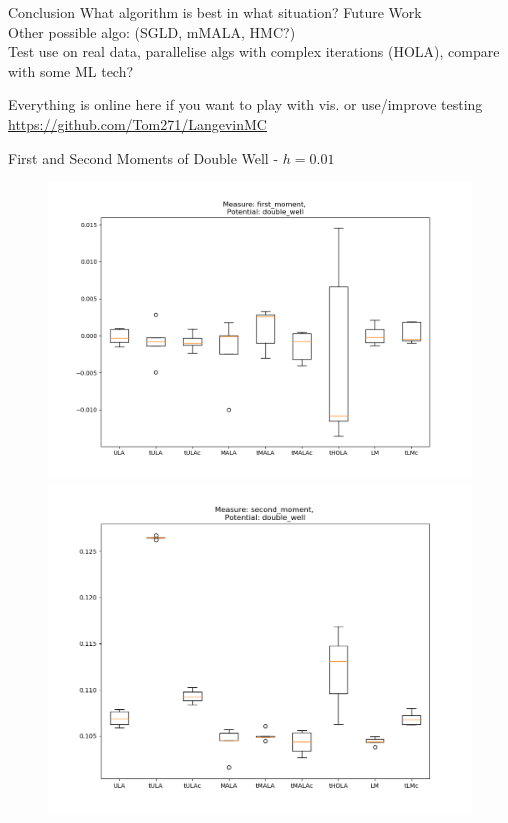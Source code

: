 \documentclass[aspectratio=169]{beamer}
\begin{document}
\begin{frame}{Conclusion}
    What algorithm is best in what situation?
    Future Work\\
    Other possible algo: (SGLD, mMALA, HMC?)\\
    Test use on real data, parallelise algs with complex iterations (HOLA), compare with some ML tech?
    
\end{frame}
\begin{frame}{}
    Everything is online here if you want to play with vis. or use/improve testing
    \url{https://github.com/Tom271/LangevinMC}
\end{frame}
\begin{frame}{First and Second Moments of Double Well - \(h=0.01\)}%
        \begin{figure}[h]
        \centering
        \begin{minipage}{0.5\linewidth}
          \centering
          \includegraphics[width=0.99\linewidth]{10sBoxPlot1moment100dim001step.png}
        \end{minipage}%
        \begin{minipage}{0.5\linewidth}
          \centering
          \includegraphics[width=0.99\linewidth]{10sBoxPlot2moment100dim001step.png}
        \end{minipage}%
        \end{figure}
\end{frame}
\end{document}
